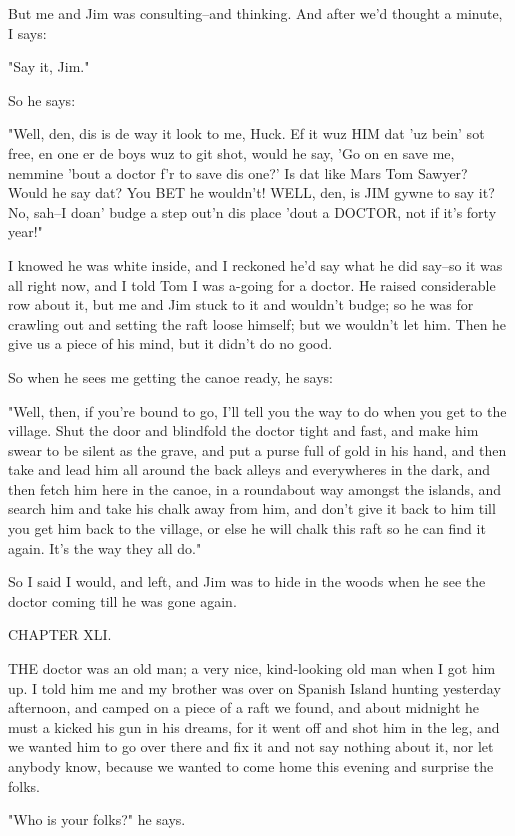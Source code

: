 But me and Jim was consulting--and thinking.  And after we'd thought a
minute, I says:

"Say it, Jim."

So he says:

"Well, den, dis is de way it look to me, Huck.  Ef it wuz HIM dat 'uz
bein' sot free, en one er de boys wuz to git shot, would he say, 'Go on
en save me, nemmine 'bout a doctor f'r to save dis one?'  Is dat like
Mars Tom Sawyer?  Would he say dat?  You BET he wouldn't!  WELL, den, is
JIM gywne to say it?  No, sah--I doan' budge a step out'n dis place 'dout
a DOCTOR, not if it's forty year!"

I knowed he was white inside, and I reckoned he'd say what he did say--so
it was all right now, and I told Tom I was a-going for a doctor.  He
raised considerable row about it, but me and Jim stuck to it and wouldn't
budge; so he was for crawling out and setting the raft loose himself; but
we wouldn't let him.  Then he give us a piece of his mind, but it didn't
do no good.

So when he sees me getting the canoe ready, he says:

"Well, then, if you're bound to go, I'll tell you the way to do when you
get to the village.  Shut the door and blindfold the doctor tight and
fast, and make him swear to be silent as the grave, and put a purse full
of gold in his hand, and then take and lead him all around the back
alleys and everywheres in the dark, and then fetch him here in the canoe,
in a roundabout way amongst the islands, and search him and take his
chalk away from him, and don't give it back to him till you get him back
to the village, or else he will chalk this raft so he can find it again.
It's the way they all do."

So I said I would, and left, and Jim was to hide in the woods when he see
the doctor coming till he was gone again.




CHAPTER XLI.

THE doctor was an old man; a very nice, kind-looking old man when I got
him up.  I told him me and my brother was over on Spanish Island hunting
yesterday afternoon, and camped on a piece of a raft we found, and about
midnight he must a kicked his gun in his dreams, for it went off and shot
him in the leg, and we wanted him to go over there and fix it and not say
nothing about it, nor let anybody know, because we wanted to come home
this evening and surprise the folks.

"Who is your folks?" he says.

